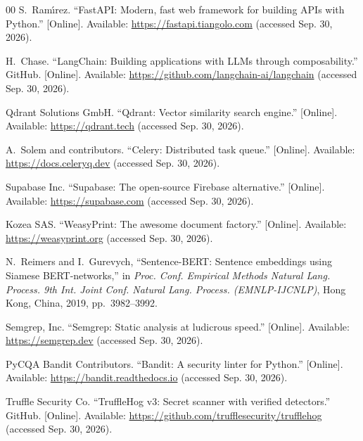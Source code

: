 \documentclass[conference]{IEEEtran}
\begin{document}
\begin{thebibliography}{00}
S.~Ram{\'\i}rez. ``FastAPI: Modern, fast web framework for building APIs with
Python.'' [Online]. Available: \url{https://fastapi.tiangolo.com} (accessed
Sep. 30, 2026).

H.~Chase. ``LangChain: Building applications with LLMs through composability.''
GitHub. [Online]. Available: \url{https://github.com/langchain-ai/langchain}
(accessed Sep. 30, 2026).

Qdrant Solutions GmbH. ``Qdrant: Vector similarity search engine.'' [Online].
Available: \url{https://qdrant.tech} (accessed Sep. 30, 2026).

A.~Solem and contributors. ``Celery: Distributed task queue.'' [Online].
Available: \url{https://docs.celeryq.dev} (accessed Sep. 30, 2026).

Supabase Inc. ``Supabase: The open-source Firebase alternative.'' [Online].
Available: \url{https://supabase.com} (accessed Sep. 30, 2026).

Kozea SAS. ``WeasyPrint: The awesome document factory.'' [Online]. Available:
\url{https://weasyprint.org} (accessed Sep. 30, 2026).

N.~Reimers and I.~Gurevych, ``Sentence-BERT: Sentence embeddings using Siamese
BERT-networks,'' in \textit{Proc. Conf. Empirical Methods Natural Lang. Process.
9th Int. Joint Conf. Natural Lang. Process. (EMNLP-IJCNLP)}, Hong Kong, China,
2019, pp.~3982--3992.

Semgrep, Inc. ``Semgrep: Static analysis at ludicrous speed.'' [Online].
Available: \url{https://semgrep.dev} (accessed Sep. 30, 2026).

PyCQA Bandit Contributors. ``Bandit: A security linter for Python.'' [Online].
Available: \url{https://bandit.readthedocs.io} (accessed Sep. 30, 2026).

Truffle Security Co. ``TruffleHog v3: Secret scanner with verified detectors.''
GitHub. [Online]. Available: \url{https://github.com/trufflesecurity/trufflehog}
(accessed Sep. 30, 2026).

\end{thebibliography}
\end{document}
